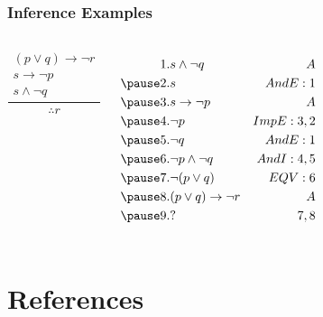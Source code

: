\documentclass[dvipsnames]{beamer}
\begin{document}
\begin{frame}
  \frametitle{Inference Examples}

  \begin{columns}
    \[
    \frac
      {
        \begin{array}{c}
          (p \vee q) \rightarrow \neg r\\
          s \rightarrow \neg p\\
          s \wedge \neg q
        \end{array}
      }
      {
        \therefore r
      }
    \]

    \pause
    \begin{eqnarray*}
      1. & s \wedge \neg q               & A\\
      \pause
      2. & s                             & AndE:1\\
      \pause
      3. & s \rightarrow \neg p          & A\\
      \pause
      4. & \neg p                        & ImpE:3,2\\
      \pause
      5. & \neg q                        & AndE:1\\
      \pause
      6. & \neg p \wedge \neg q          & AndI:4,5\\
      \pause
      7. & \neg (p \vee q)               & EQV:6\\
      \pause
      8. & (p \vee q) \rightarrow \neg r & A\\
      \pause
      9. & ?                             & 7,8
    \end{eqnarray*}
  \end{columns}
\end{frame}

\section*{References}
\end{document}

